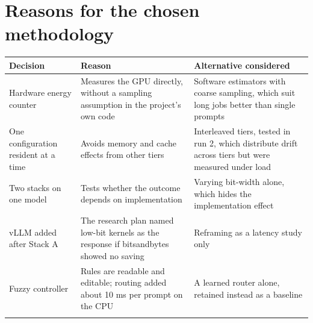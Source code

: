 \section{Reasons for the chosen methodology}

\begingroup\footnotesize\setlength{\tabcolsep}{4pt}
\begin{longtable}{>{\raggedright\arraybackslash}p{38.8mm}>{\raggedright\arraybackslash}p{51.5mm}>{\raggedright\arraybackslash}p{51.3mm}}
\toprule
\textbf{Decision} & \textbf{Reason} & \textbf{Alternative considered} \\
\midrule
\endhead
Hardware energy counter & Measures the GPU directly, without a sampling assumption in the project's own code & Software estimators with coarse sampling, which suit long jobs better than single prompts \\*
One configuration resident at a time & Avoids memory and cache effects from other tiers & Interleaved tiers, tested in run 2, which distribute drift across tiers but were measured under load \\*
Two stacks on one model & Tests whether the outcome depends on implementation & Varying bit-width alone, which hides the implementation effect \\*
vLLM added after Stack A & The research plan named low-bit kernels as the response if bitsandbytes showed no saving & Reframing as a latency study only \\*
Fuzzy controller & Rules are readable and editable; routing added about 10 ms per prompt on the CPU & A learned router alone, retained instead as a baseline \\*
\bottomrule\noalign{\nobreak}
\end{longtable}
\addtocounter{table}{-1}
\endgroup

